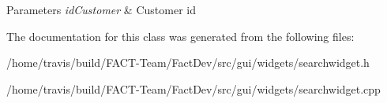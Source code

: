\begin{DoxyParams}{Parameters}
{\em id\-Customer} & Customer id \\
\hline
\end{DoxyParams}


The documentation for this class was generated from the following files\-:\begin{DoxyCompactItemize}
\item 
/home/travis/build/\-F\-A\-C\-T-\/\-Team/\-Fact\-Dev/src/gui/widgets/searchwidget.\-h\item 
/home/travis/build/\-F\-A\-C\-T-\/\-Team/\-Fact\-Dev/src/gui/widgets/searchwidget.\-cpp\end{DoxyCompactItemize}
